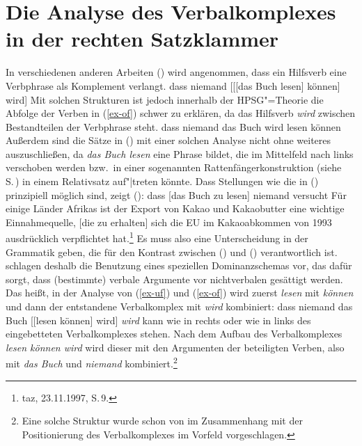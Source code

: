 \section{Die Analyse des Verbalkomplexes in der rechten Satzklammer}
\label{sec-verbalkomplex}

In verschiedenen anderen Arbeiten (\zb {}) 
wird angenommen, dass ein Hilfsverb eine Verbphrase als Komplement verlangt. 
\ea
\label{ex-uf}
dass niemand [[[das Buch lesen] können] wird]
\z
Mit solchen Strukturen ist jedoch innerhalb der HPSG"=Theorie
die Abfolge der Verben in (\ref{ex-of}) schwer zu erklären,
da das Hilfsverb \emph{wird} zwischen Bestandteilen der Verbphrase steht.
\ea
\label{ex-of}
dass niemand das Buch wird lesen können
\z
Außerdem sind die Sätze in () mit einer solchen Analyse nicht ohne weiteres auszuschließen,
da \emph{das Buch lesen} eine Phrase bildet, die im Mittelfeld nach links verschoben
werden bzw.\ in einer sogenannten Rattenfängerkonstruktion (siehe S.\,\pageref{page-rattenfaenger})
in einem Relativsatz auf"|treten könnte.
\eal
{}
\zl
Dass Stellungen wie die in () prinzipiell möglich sind, zeigt ():
\eal
\ex dass [das Buch zu lesen] niemand versucht
\ex Für einige Länder Afrikas ist der Export von Kakao und Kakaobutter eine wichtige
Einnahmequelle, [die zu erhalten] sich die EU im Kakaoabkommen von 1993 ausdrücklich
verpflichtet hat.\footnote{
        taz, 23.11.1997, S.\,9.
}
\zl
Es muss also eine Unterscheidung in der Grammatik geben, die für den Kontrast
zwischen () und () verantwortlich ist.
\citet*{HN94a} 
schlagen deshalb die Benutzung eines speziellen Dominanzschemas vor, 
das dafür sorgt, dass (bestimmte) verbale Argumente vor nichtverbalen gesättigt werden. Das heißt,
in der Analyse von (\ref{ex-uf}) und (\ref{ex-of}) wird zuerst \emph{lesen} mit \emph{können}
und dann der entstandene Verbalkomplex mit \emph{wird} kombiniert:
\ea
\label{ex-struktur-lesen-koennen-wird}
dass niemand das Buch [[lesen können] wird]
\z
\emph{wird} kann wie in  rechts oder wie in  links des eingebetteten Verbalkomplexes
stehen. Nach dem Aufbau des Verbalkomplexes \emph{lesen können wird} wird dieser mit den Argumenten 
der beteiligten Verben, also mit \emph{das Buch} und \emph{niemand} kombiniert.\footnote{
        Eine solche Struktur wurde schon von 
        \citet*{Johnson86a}
        im Zusammenhang mit der Positionierung des Verbalkomplexes im
        Vorfeld vorgeschlagen.
}

